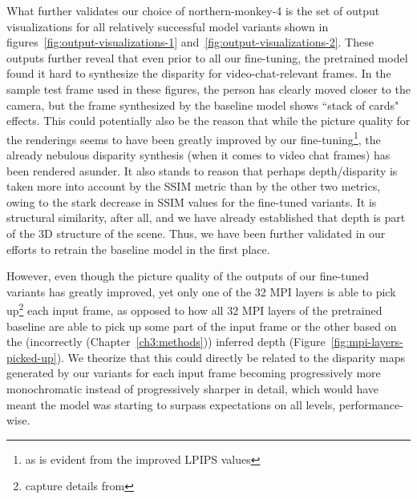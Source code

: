 What further validates our choice of northern-monkey-4 is the set of output visualizations for all relatively successful model variants shown in figures~\ref{fig:output-visualizations-1} and~\ref{fig:output-visualizations-2}. These outputs further reveal that even prior to all our fine-tuning, the pretrained model found it hard to synthesize the disparity for video-chat-relevant frames. In the sample test frame used in these figures, the person has clearly moved closer to the camera, but the frame synthesized by the baseline model shows ``stack of cards" effects. This could potentially also be the reason that while the picture quality for the renderings seems to have been greatly improved by our fine-tuning\footnote{as is evident from the improved LPIPS values}, the already nebulous disparity synthesis (when it comes to video chat frames) has been rendered asunder. It also stands to reason that perhaps depth/disparity is taken more into account by the SSIM metric than by the other two metrics, owing to the stark decrease in SSIM values for the fine-tuned variants. It is structural similarity, after all, and we have already established that depth is part of the 3D structure of the scene. Thus, we have been further validated in our efforts to retrain the baseline model in the first place.

However, even though the picture quality of the outputs of our fine-tuned variants has greatly improved, yet only one of the 32 MPI layers is able to pick up\footnote{capture details from} each input frame, as opposed to how all 32 MPI layers of the pretrained baseline are able to pick up some part of the input frame or the other based on the (incorrectly (Chapter~\ref{ch3:methods})) inferred depth (Figure~\ref{fig:mpi-layers-picked-up}). We theorize that this could directly be related to the disparity maps generated by our variants for each input frame becoming progressively more monochromatic instead of progressively sharper in detail, which would have meant the model was starting to surpass expectations on all levels, performance-wise. 


